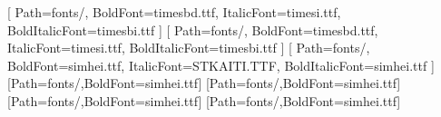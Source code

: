 \setmainfont{times.ttf}[
  Path=fonts/,
  BoldFont=timesbd.ttf,
  ItalicFont=timesi.ttf,
  BoldItalicFont=timesbi.ttf
]
\setsansfont{times.ttf}[
  Path=fonts/,
  BoldFont=timesbd.ttf,
  ItalicFont=timesi.ttf,
  BoldItalicFont=timesbi.ttf
]
[
  Path=fonts/,
  BoldFont=simhei.ttf,
  ItalicFont=STKAITI.TTF,
  BoldItalicFont=simhei.ttf
]
[Path=fonts/,BoldFont=simhei.ttf]
[Path=fonts/,BoldFont=simhei.ttf]
[Path=fonts/,BoldFont=simhei.ttf]
[Path=fonts/,BoldFont=simhei.ttf]
\providecommand{\songti}{}
\providecommand{\heiti}{}
\providecommand{\kaishu}{}
\renewcommand{\songti}{\CJKfamily{zhsong}}
\renewcommand{\heiti}{\CJKfamily{zhhei}}
\renewcommand{\kaishu}{\CJKfamily{zhkai}}

\newcommand{\JournalChineseTitle}{\normalfont\heiti\fontsize{16bp}{21bp}\selectfont}
\newcommand{\JournalEnglishTitle}{\normalfont\bfseries\fontsize{16bp}{21bp}\selectfont}
\newcommand{\JournalChineseAuthor}{\normalfont\kaishu\fontsize{10.5bp}{14bp}\selectfont}
\newcommand{\JournalEnglishAuthor}{\normalfont\fontsize{10.5bp}{14bp}\selectfont}
\newcommand{\JournalAffiliation}{\normalfont\songti\fontsize{7.5bp}{11bp}\selectfont}
\newcommand{\JournalAbstract}{\normalfont\songti\fontsize{9bp}{14.67bp}\selectfont}
